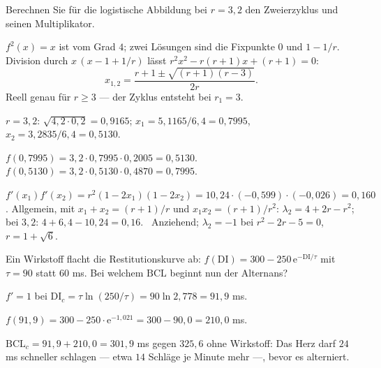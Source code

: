 \begin{aufgabe}
Berechnen Sie für die logistische Abbildung bei $r = 3{,}2$ den Zweierzyklus und seinen Multiplikator.

\loesung
{}
$f^{2}(x) = x$ ist vom Grad $4$; zwei Lösungen sind die Fixpunkte $0$ und $1 - 1/r$. Division durch $x\,(x - 1 + 1/r)$ lässt $r^{2}x^{2} - r(r+1)x + (r+1) = 0$:
\[ x_{1,2} = \frac{r + 1 \pm \sqrt{(r+1)(r-3)}}{2r} . \]
Reell genau für $r \ge 3$ --- der Zyklus entsteht bei $r_1 = 3$. \checkmark

$r = 3{,}2$: $\sqrt{4{,}2\cdot0{,}2} = 0{,}9165$; $x_1 = 5{,}1165/6{,}4 = 0{,}7995$, $x_2 = 3{,}2835/6{,}4 = 0{,}5130$.

$f(0{,}7995) = 3{,}2\cdot0{,}7995\cdot0{,}2005 = 0{,}5130$. \checkmark\ $f(0{,}5130) = 3{,}2\cdot0{,}5130\cdot0{,}4870 = 0{,}7995$. \checkmark

$f'(x_1)f'(x_2) = r^{2}(1-2x_1)(1-2x_2) = 10{,}24\cdot(-0{,}599)\cdot(-0{,}026) = 0{,}160$. Allgemein, mit $x_1 + x_2 = (r+1)/r$ und $x_1x_2 = (r+1)/r^{2}$: $\lambda_2 = 4 + 2r - r^{2}$; bei $3{,}2$: $4 + 6{,}4 - 10{,}24 = 0{,}16$. \checkmark\ Anziehend; $\lambda_2 = -1$ bei $r^{2} - 2r - 5 = 0$, $r = 1 + \sqrt6$. \checkmark
\end{aufgabe}

\begin{aufgabe}
Ein Wirkstoff flacht die Restitutionskurve ab: $f(\mathrm{DI}) = 300 - 250\,\mathrm e^{-\mathrm{DI}/\tau}$ mit $\tau = 90$ statt $60$ ms. Bei welchem $\mathrm{BCL}$ beginnt nun der Alternans?

\loesung
{}
$f' = 1$ bei $\mathrm{DI}_c = \tau\ln(250/\tau) = 90\ln2{,}778 = 91{,}9$ ms.

$f(91{,}9) = 300 - 250\cdot\mathrm e^{-1{,}021} = 300 - 90{,}0 = 210{,}0$ ms.

$\mathrm{BCL}_c = 91{,}9 + 210{,}0 = 301{,}9$ ms gegen $325{,}6$ ohne Wirkstoff: Das Herz darf $24$ ms schneller schlagen --- etwa $14$ Schläge je Minute mehr ---, bevor es alterniert.

\begin{center}
\begin{minipage}{0.88\textwidth}
\end{minipage}
\end{center}
\end{aufgabe}

